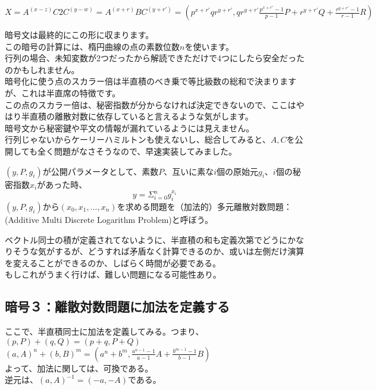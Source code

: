 \documentclass[
]{article}
\begin{document}
\(X=A^{(x-z)}C2C^{(y-w)}=A^{(x+r)}BC^{(y+r')}=(p^{x+r'}qr^{y+r'},qr^{y+r'}\frac{p^{x+r'}-1}{p-1}P+r^{y+r'}Q+\frac{r^{y+r'}-1}{r-1}R)\)

暗号文は最終的にこの形に収まります。\\
この暗号の計算には、楕円曲線の点の素数位数\(n\)を使います。\\
行列の場合、未知変数が2つだったから解読できただけで4つにしたら安全だったのかもしれません。\\
暗号化に使う点のスカラー倍は半直積のべき乗で等比級数の総和で決まりますが、これは半直席の特徴です。\\
この点のスカラー倍は、秘密指数が分からなければ決定できないので、ここはやはり半直積の離散対数に依存していると言えるような気がします。\\
暗号文から秘密鍵や平文の情報が漏れているようには見えません。\\
行列じゃないからケーリーハミルトンも使えないし、総合してみると、\(A,C\)を公開しても全く問題がなさそうなので、早速実装してみました。

\((y,P,g_i)\)が公開パラメータとして、素数\(P\)、互いに素な\(i\)個の原始元\(g_i\)、\(i\)個の秘密指数\(x_i\)があった時、\\
\[y=\Sigma^n_{i=0}g_i^{x_i}\]
\((y,P,g_i)\)から\((x_0,x_1,...,x_n)\)を求める問題を（加法的）多元離散対数問題：(Additive
Multi Discrete Logarithm Problem)と呼ぼう。

ベクトル同士の積が定義されてないように、半直積の和も定義次第でどうにかなりそうな気がするが、どうすれば矛盾なく計算できるのか、或いは左側だけ演算を変えることができるのか、しばらく時間が必要である。\\
もしこれがうまく行けば、難しい問題になる可能性あり。

\hypertarget{ux6697ux53f7uxff13ux96e2ux6563ux5bfeux6570ux554fux984cux306bux52a0ux6cd5ux3092ux5b9aux7fa9ux3059ux308b}{%
\subsection{暗号３：離散対数問題に加法を定義する}\label{ux6697ux53f7uxff13ux96e2ux6563ux5bfeux6570ux554fux984cux306bux52a0ux6cd5ux3092ux5b9aux7fa9ux3059ux308b}}

ここで、半直積同士に加法を定義してみる。つまり、\\
\((p,P)+(q,Q)=(p+q,P+Q)\)\\
\((a,A)^n+(b,B)^m=(a^n+b^m,\frac{a^{n-1}-1}{a-1}A+\frac{b^{m-1}-1}{b-1}B)\)\\
よって、加法に関しては、可換である。\\
逆元は、\((a,A)^{-1}=(-a,-A)\)である。
\end{document}
